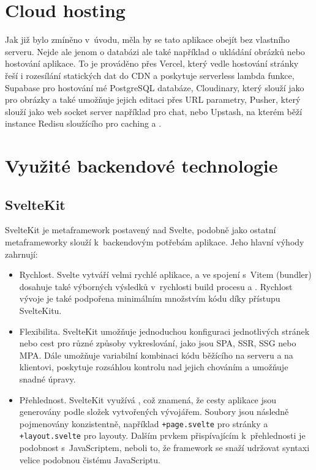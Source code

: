 \documentclass[12pt, a4paper,
openright
]{report}
\begin{document}
\section{Cloud hosting}
Jak již bylo zmíněno v~úvodu, měla by se tato aplikace obejít bez vlastního serveru. Nejde ale jenom o databázi ale také například o ukládání obrázků nebo hostování aplikace. To je prováděno přes  Vercel, který vedle hostování stránky řeší i rozesílání statických dat do CDN a poskytuje serverless lambda funkce, Supabase pro hostování mé PostgreSQL databáze, Cloudinary, který slouží jako  pro obrázky a také umožňuje jejich editaci přes URL parametry, Pusher, který slouží jako web socket server například pro chat, nebo Upstash, na kterém běží instance Redisu sloužícího pro caching a .

\section{Využité backendové technologie}

\subsection{SvelteKit}

SvelteKit je metaframework postavený nad Svelte, podobně jako ostatní metaframeworky slouží k~backendovým potřebám aplikace. Jeho hlavní výhody zahrnují:
\begin{itemize}
	\item Rychlost. Svelte vytváří velmi rychlé aplikace, a ve spojení s~Vitem (bundler) dosahuje také výborných výsledků v~rychlosti build procesu a . Rychlost vývoje je také podpořena minimálním množstvím  kódu díky přístupu SvelteKitu.
	\item Flexibilita. SvelteKit umožňuje jednoduchou konfiguraci jednotlivých stránek nebo cest pro různé způsoby vykreslování, jako jsou SPA, SSR, SSG nebo MPA. Dále umožňuje variabilní kombinaci kódu běžícího na serveru a na klientovi, poskytuje rozsáhlou kontrolu nad jejich chováním a umožňuje snadné úpravy.
	\item Přehlednost. SvelteKit využívá , což znamená, že cesty aplikace jsou generovány podle složek vytvořených vývojářem. Soubory jsou následně pojmenovány konzistentně, například \texttt{+page.svelte} pro stránky a \texttt{+layout.svelte} pro layouty. Dalším prvkem přispívajícím k~přehlednosti je podobnost s~JavaScriptem, neboli to, že framework se snaží udržovat syntaxi velice podobnou čistému JavaScriptu.
\end{itemize} 
\end{document}
